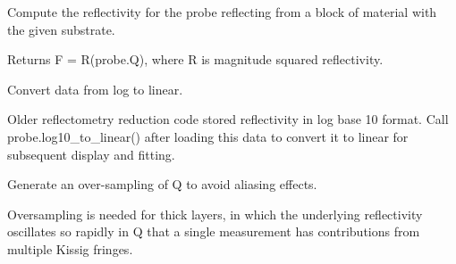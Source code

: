 \documentclass[letterpaper,10pt,english]{sphinxmanual}
\begin{document}
\begin{fulllineitems}

\begin{fulllineitems}
\label{api/probe:refl1d.probe.ProbeSet.fresnel}
Compute the reflectivity for the probe reflecting from a block of
material with the given substrate.

Returns F = R(probe.Q), where R is magnitude squared reflectivity.

\end{fulllineitems}


\begin{fulllineitems}
\label{api/probe:refl1d.probe.ProbeSet.label}
\end{fulllineitems}


\begin{fulllineitems}
\label{api/probe:refl1d.probe.ProbeSet.log10_to_linear}
Convert data from log to linear.

Older reflectometry reduction code stored reflectivity in log base 10
format.  Call probe.log10\_to\_linear() after loading this data to
convert it to linear for subsequent display and fitting.

\end{fulllineitems}


\begin{fulllineitems}
\label{api/probe:refl1d.probe.ProbeSet.name}
\end{fulllineitems}


\begin{fulllineitems}
\label{api/probe:refl1d.probe.ProbeSet.oversample}
Generate an over-sampling of Q to avoid aliasing effects.

Oversampling is needed for thick layers, in which the underlying
reflectivity oscillates so rapidly in Q that a single measurement
has contributions from multiple Kissig fringes.


\end{fulllineitems}
\end{fulllineitems}
\end{document}
